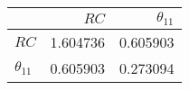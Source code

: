 \begin{tabular}{lrr}
\toprule
{} &      $RC$ &  $\theta_{11}$ \\
\midrule
$RC$          &  1.604736 &       0.605903 \\
$\theta_{11}$ &  0.605903 &       0.273094 \\
\bottomrule
\end{tabular}
